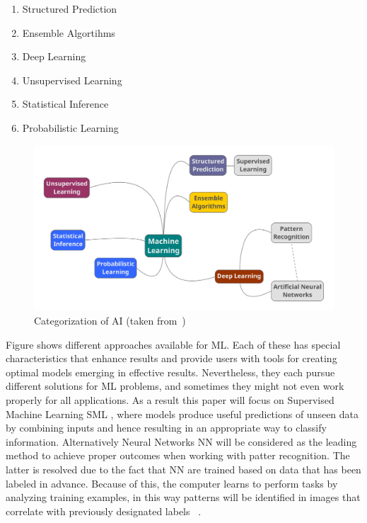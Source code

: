 \begin{enumerate}
 \item Structured Prediction
 \item Ensemble Algortihms
 \item Deep Learning 
 \item Unsupervised Learning
 \item Statistical Inference 
 \item Probabilistic Learning
\end{enumerate}

\begin{figure}[htbp]
  \centering
  \includegraphics[width=\textwidth]{images/ai-categorization}
  \caption{Categorization of \ac{AI} (taken from~\cite{})}
  \label{fig:ai-categorization}
\end{figure}

Figure   shows different approaches available for \ac{ML}. Each of these has special characteristics that enhance results and provide users with tools for creating optimal models emerging in effective results.  Nevertheless, they each pursue different solutions for  \ac{ML} problems, and sometimes they might not even work properly for all applications. As a result this paper will focus on Supervised Machine Learning  \ac{SML} , where models produce useful predictions of unseen data by combining inputs and hence resulting in an appropriate way to classify information. Alternatively Neural Networks   \ac{NN}  will be considered as the leading method to achieve proper outcomes when working with patter recognition. The latter is resolved due to the fact that  \ac{NN}  are trained based on data that has been labeled in advance. Because of this, the computer learns to perform tasks by analyzing training examples, in this way patterns will be identified in images that correlate with previously designated labels~\cite{mit17} . 

